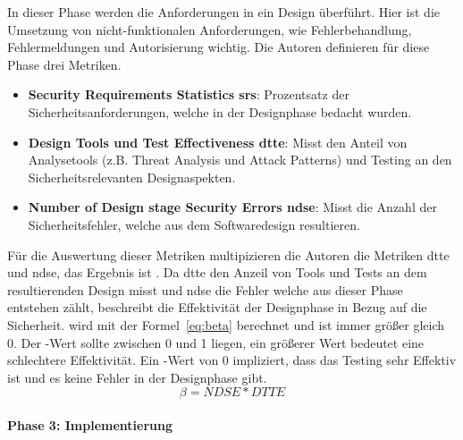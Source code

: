 \documentclass[12pt, a4paper, ngerman]{article}
\begin{document}
In dieser Phase werden die Anforderungen in ein Design überführt. 
Hier ist die Umsetzung von nicht-funktionalen Anforderungen, wie Fehlerbehandlung, Fehlermeldungen und Autorisierung wichtig.
Die Autoren definieren für diese Phase drei Metriken.
\begin{itemize}
  \item \textbf{Security Requirements Statistics \ac{srs}}: Prozentsatz der Sicherheitsanforderungen, welche in der Designphase bedacht wurden.
  \item \textbf{Design Tools und Test Effectiveness \ac{dtte}}: Misst den Anteil von Analysetools (z.B. Threat Analysis und Attack Patterns) und Testing an den Sicherheitsrelevanten Designaspekten. 
  \item \textbf{Number of Design stage Security Errors \ac{ndse}}: Misst die Anzahl der Sicherheitsfehler, welche aus dem Softwaredesign resultieren. 
\end{itemize}
Für die Auswertung dieser Metriken multipizieren die Autoren die Metriken \ac{dtte} und \ac{ndse}, das Ergebnis ist \beta. 
Da \ac{dtte} den Anzeil von Tools und Tests an dem resultierenden Design misst und \ac{ndse} die Fehler welche aus dieser Phase entstehen zählt, 
beschreibt \beta die Effektivität der Designphase in Bezug auf die Sicherheit.
\beta wird mit der Formel~\ref{eq:beta} berechnet und ist immer größer gleich 0. 
Der \beta-Wert sollte zwischen 0 und 1 liegen, ein größerer Wert bedeutet eine schlechtere Effektivität.
Ein \beta-Wert von 0 impliziert, dass das Testing sehr Effektiv ist und es keine Fehler in der Designphase gibt.
\begin{equation} \label{eq:beta}
  \beta = NDSE * DTTE
\end{equation}

\paragraph{Phase 3: Implementierung}
\end{document}
